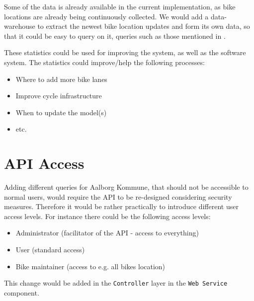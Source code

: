 Some of the data is already available in the current implementation, as bike locations are already being continuously collected.
We would add a data-warehouse to extract the newest bike location updates and form its own data, so that it could be easy to query on it, queries such as those mentioned in .

These statistics could be used for improving the \citybike system, as well as the software system.
The statistics could improve/help the following processes:
\begin{itemize}
\item Where to add more bike lanes
\item Improve cycle infrastructure
\item When to update the model(s)
\item etc.
\end{itemize}

\section{API Access}
Adding different queries for Aalborg Kommune, that should not be accessible to normal users, would require the API to be re-designed considering security measures.
Therefore it would be rather practically to introduce different user access levels.
For instance there could be the following access levels:
\begin{itemize}
\item Administrator (facilitator of the API - access to everything)
\item User (standard access)
\item Bike maintainer (access to e.g. all bikes location)
\end{itemize}
This change would be added in the \texttt{Controller} layer in the \texttt{Web Service} component.

